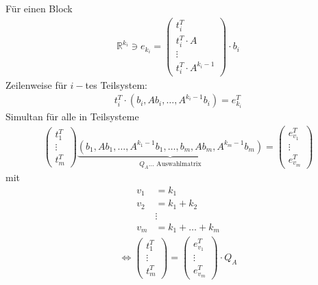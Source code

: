 \documentclass[ngerman]{tudscrreprt}
\begin{document}
Für einen Block \begin{align*}
\mathbb{R}^{k_i} \ni e_{k_i} = \begin{pmatrix} 
t_i^T\\ t_i^T\cdot A\\ \vdots\\ t_i^T\cdot A^{k_i -1} 
\end{pmatrix}\cdot b_i
\end{align*}
Zeilenweise für $i-$tes Teilsystem: \begin{align*}
t_i^T \cdot (b_i, Ab_i ,\dots, A^{k_i -1}b_i ) = e_{k_i}^T
\end{align*}
Simultan für alle in Teilsysteme 
\begin{align*}
\begin{pmatrix}
t_1^T\\ \vdots\\ t_m^T
\end{pmatrix} \underbrace{
(b_1,Ab_1,\dots, A^{k_1 -1} b_1, \dots, b_m, Ab_m, A^{k_m-1}b_m)
}_{Q_A \dots \text{ Auswahlmatrix}}
= \begin{pmatrix} e_{v_1}^T\\ \vdots\\ e_{v_m}^T\end{pmatrix}
\end{align*} mit \begin{align*} v_1 &= k_1\\ v_2&= k_1 + k_2\\ &\vdots\\ v_m&= k_1 + \dots + k_m \end{align*} \begin{align*}
\iff \begin{pmatrix}
t_1^T\\ \vdots\\ t_m^T 
\end{pmatrix} = \begin{pmatrix} e_{v_1}^T\\ \vdots\\ e_{v_m}^T \end{pmatrix} \cdot Q_A
\end{align*} 
\end{document}
